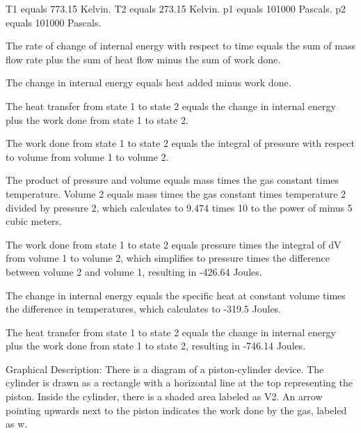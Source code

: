 T1 equals 773.15 Kelvin.
T2 equals 273.15 Kelvin.
p1 equals 101000 Pascals.
p2 equals 101000 Pascals.

The rate of change of internal energy with respect to time equals the sum of mass flow rate plus the sum of heat flow minus the sum of work done.

The change in internal energy equals heat added minus work done.

The heat transfer from state 1 to state 2 equals the change in internal energy plus the work done from state 1 to state 2.

The work done from state 1 to state 2 equals the integral of pressure with respect to volume from volume 1 to volume 2.

The product of pressure and volume equals mass times the gas constant times temperature.
Volume 2 equals mass times the gas constant times temperature 2 divided by pressure 2, which calculates to 9.474 times 10 to the power of minus 5 cubic meters.

The work done from state 1 to state 2 equals pressure times the integral of dV from volume 1 to volume 2, which simplifies to pressure times the difference between volume 2 and volume 1, resulting in -426.64 Joules.

The change in internal energy equals the specific heat at constant volume times the difference in temperatures, which calculates to -319.5 Joules.

The heat transfer from state 1 to state 2 equals the change in internal energy plus the work done from state 1 to state 2, resulting in -746.14 Joules.

Graphical Description:
There is a diagram of a piston-cylinder device. The cylinder is drawn as a rectangle with a horizontal line at the top representing the piston. Inside the cylinder, there is a shaded area labeled as V2. An arrow pointing upwards next to the piston indicates the work done by the gas, labeled as w.